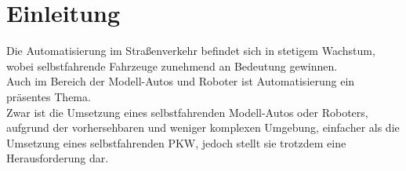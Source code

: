 \section{Einleitung}
Die Automatisierung im Straßenverkehr befindet sich in stetigem Wachstum, wobei selbstfahrende Fahrzeuge zunehmend an Bedeutung gewinnen. \\
Auch im Bereich der Modell-Autos und Roboter ist Automatisierung ein präsentes Thema. \\
Zwar ist die Umsetzung eines selbstfahrenden Modell-Autos oder Roboters, aufgrund der vorhersehbaren und weniger komplexen Umgebung, 
einfacher als die Umsetzung eines selbstfahrenden PKW, jedoch stellt sie trotzdem eine Herausforderung dar.